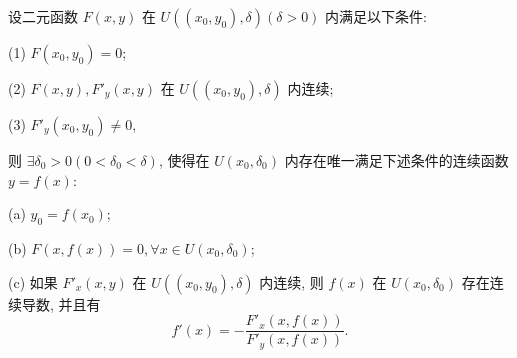 \documentclass[12pt,fontset=fandol]{ctexart}
\begin{document}
\begin{theorem}[隐函数存在定理]\label{course-theorem-14-4-1}\quad 设二元函数 $F(x,y)$ 在 $U((x_0,y_0),\delta)(\delta>0)$ 内满足以下条件:

(1) $F(x_0,y_0)=0$;

(2) $F(x,y),F'_y(x,y)$ 在 $U((x_0,y_0),\delta)$ 内连续;

(3) $F'_y(x_0,y_0)\ne0$,

则 $\exists\delta_0>0(0<\delta_0<\delta)$, 使得在 $U(x_0,\delta_0)$ 内存在唯一满足下述条件的连续函数 $y=f(x)$:

(a) $y_0=f(x_0)$;

(b) $F(x,f(x))=0,\forall x\in U(x_0,\delta_0)$;

(c) 如果 $F'_x(x,y)$ 在 $U((x_0,y_0),\delta)$ 内连续, 则 $f(x)$ 在 $U(x_0,\delta_0)$ 存在连续导数, 并且有
\[
  f'(x)=-\frac{F'_x(x,f(x))}{F'_y(x,f(x))}.
\]

\end{theorem}
\end{document}
